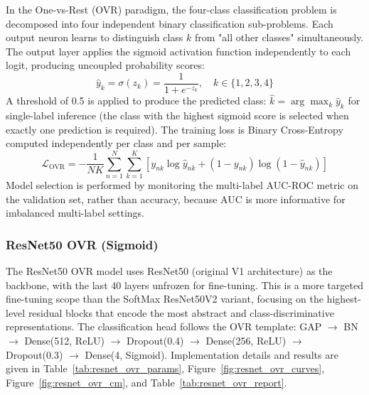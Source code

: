 In the One-vs-Rest (OVR) paradigm, the four-class classification problem is decomposed into four independent binary classification sub-problems. Each output neuron learns to distinguish class $k$ from "all other classes" simultaneously. The output layer applies the sigmoid activation function independently to each logit, producing uncoupled probability scores:
\begin{equation}
	\hat{y}_k = \sigma(z_k) = \frac{1}{1 + e^{-z_k}}, \quad k \in \{1,2,3,4\}
\end{equation}
A threshold of 0.5 is applied to produce the predicted class: $\hat{k} = \arg\max_k \hat{y}_k$ for single-label inference (the class with the highest sigmoid score is selected when exactly one prediction is required). The training loss is Binary Cross-Entropy computed independently per class and per sample:
\begin{equation}
	\mathcal{L}_{\text{OVR}} = -\frac{1}{NK} \sum_{n=1}^N \sum_{k=1}^K \left[ y_{nk} \log \hat{y}_{nk} + (1 - y_{nk}) \log (1 - \hat{y}_{nk}) \right]
\end{equation}
Model selection is performed by monitoring the multi-label AUC-ROC metric on the validation set, rather than accuracy, because AUC is more informative for imbalanced multi-label settings.

\subsubsection{ResNet50 OVR (Sigmoid)}

The ResNet50 OVR model uses ResNet50 (original V1 architecture) as the backbone, with the last 40 layers unfrozen for fine-tuning. This is a more targeted fine-tuning scope than the SoftMax ResNet50V2 variant, focusing on the highest-level residual blocks that encode the most abstract and class-discriminative representations. The classification head follows the OVR template: GAP $\to$ BN $\to$ Dense(512, ReLU) $\to$ Dropout(0.4) $\to$ Dense(256, ReLU) $\to$ Dropout(0.3) $\to$ Dense(4, Sigmoid). Implementation details and results are given in Table~\ref{tab:resnet_ovr_params}, Figure~\ref{fig:resnet_ovr_curves}, Figure~\ref{fig:resnet_ovr_cm}, and Table~\ref{tab:resnet_ovr_report}.

